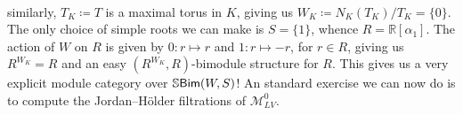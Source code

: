 \begin{example}
\begin{align*}
\end{align*}
\noindent similarly, $T_K \coloneqq T$ is a maximal torus in $K$, giving us $W_K \coloneqq N_K(T_K)/T_K = \{0\}$. The only choice of simple roots we can make is $S = \{1\}$, whence $R = \mathbb{R}[\alpha_1]$. The action of $W$ on $R$ is given by $0 : r \mapsto r$ and $1 : r \mapsto -r$, for $r \in R$, giving us $R^{W_K} = R$ and an easy $(R^{W_K}, R)$-bimodule structure for $R$. This gives us a very explicit module category over $\mathbb{S}\textnormal{\textsf{Bim}}(W, S)$! An standard exercise we can now do is to compute the Jordan--H\"{o}lder filtrations of $\mathcal{M}_{LV}^0$.
\end{example}


